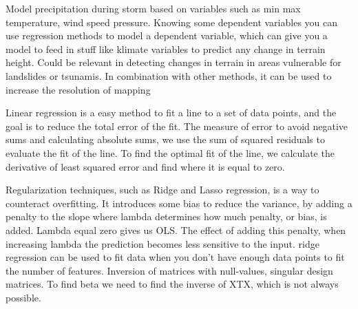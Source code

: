 
Model precipitation during storm based on variables such as min max temperature, wind speed pressure. Knowing some dependent variables you can use regression methods to model a dependent variable, which can give you a model to feed in stuff like klimate variables to predict any change in terrain height. Could be relevant in detecting changes in terrain in areas vulnerable for landslides or tsunamis. In combination with other methods, it can be used to increase the resolution of mapping 

Linear regression is a easy method to fit a line to a set of data points, and the goal is to reduce the total error of the fit. The measure of error to avoid negative sums and calculating absolute sums, we use the sum of squared residuals to evaluate the fit of the line. To find the optimal fit of the line, we calculate the derivative of least squared error and find where it is equal to zero.

Regularization techniques, such as Ridge and Lasso regression, is a way to counteract overfitting. It introduces some bias to reduce the variance, by adding a penalty to the slope where lambda determines how much penalty, or bias, is added. Lambda equal zero gives us OLS. The effect of adding this penalty, when increasing lambda the prediction becomes less sensitive to the input. ridge regression can be used to fit data when you don't have enough data points to fit the number of features. Inversion of matrices with null-values, singular design matrices. To find beta we need to find the inverse of XTX, which is not always possible.

